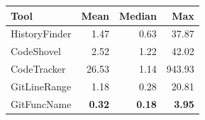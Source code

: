 \begin{tabular}{lrrr}
\toprule
\textbf{Tool} & \textbf{Mean} & \textbf{Median} & \textbf{Max} \\
\midrule
HistoryFinder & 1.47 & 0.63 & 37.87 \\
CodeShovel & 2.52 & 1.22 & 42.02 \\
CodeTracker & 26.53 & 1.14 & 943.93 \\
GitLineRange & 1.18 & 0.28 & 20.81 \\
GitFuncName & \textbf{0.32} & \textbf{0.18} & \textbf{3.95} \\
\bottomrule
\end{tabular}
